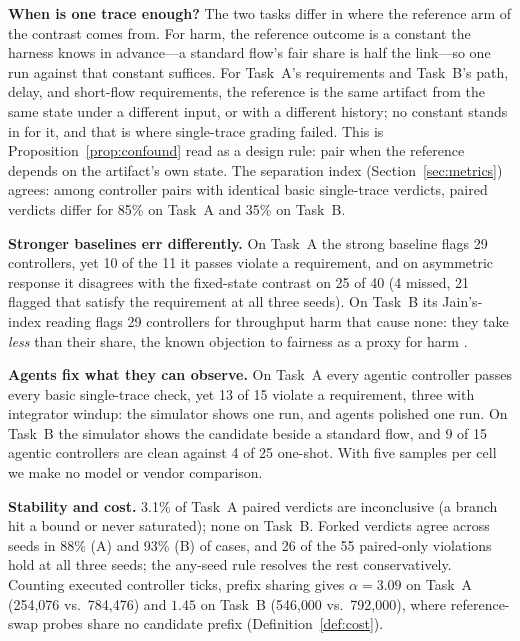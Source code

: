 \documentclass[conference]{IEEEtran}
\begin{document}
	\textbf{When is one trace enough?} The two tasks differ in where the
	reference arm of the contrast comes from. For harm, the reference
	outcome is a constant the harness knows in advance---a standard flow's
	fair share is half the link---so one run against that constant
	suffices. For Task~A's requirements and Task~B's path, delay, and
	short-flow requirements, the reference is the same artifact from the
	same state under a different input, or with a different history; no
	constant stands in for it, and that is where single-trace grading
	failed. This is Proposition~\ref{prop:confound} read as a design rule:
	pair when the reference depends on the artifact's own state. The separation index (Section~\ref{sec:metrics}) agrees: among
	controller pairs with identical basic single-trace verdicts, paired
	verdicts differ for 85\% on Task~A and 35\% on Task~B.
	
	\textbf{Stronger baselines err differently.} On Task~A the strong
	baseline flags 29 controllers, yet 10 of the 11 it passes violate a
	requirement, and on asymmetric response it disagrees with the
	fixed-state contrast on 25 of 40 (4 missed, 21 flagged that satisfy the
	requirement at all three seeds). On Task~B its Jain's-index reading
	flags 29 controllers for throughput harm that cause none: they take
	\emph{less} than their share, the known objection to fairness as a
	proxy for harm \cite{ware2019}.
	
	\textbf{Agents fix what they can observe.} On Task~A every agentic
	controller passes every basic single-trace check, yet 13 of 15 violate
	a requirement, three with integrator windup: the simulator shows one
	run, and agents polished one run. On Task~B the simulator shows the
	candidate beside a standard flow, and 9 of 15 agentic controllers are
	clean against 4 of 25 one-shot. With five samples per cell we make no
	model or vendor comparison.
	
	\textbf{Stability and cost.}
	\label{sec:eval-cost}
	3.1\% of Task~A paired verdicts are inconclusive (a branch hit a bound
	or never saturated); none on Task~B. Forked verdicts agree across seeds
	in 88\% (A) and 93\% (B) of cases, and 26 of the 55 paired-only
	violations hold at all three seeds; the any-seed rule resolves the rest
	conservatively. Counting executed controller ticks, prefix sharing
	gives $\alpha = 3.09$ on Task~A (254{,}076 vs.\ 784{,}476) and
	$1.45$ on Task~B (546{,}000 vs.\ 792{,}000), where reference-swap probes
	share no candidate prefix (Definition~\ref{def:cost}).
	\label{sec:future}
	
\end{document}

